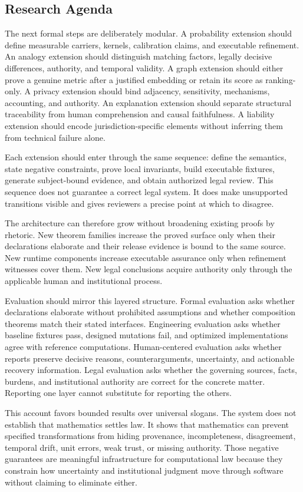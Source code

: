 \subsection*{Research Agenda}

The next formal steps are deliberately modular. A probability extension should define measurable carriers, kernels, calibration claims, and executable refinement. An analogy extension should distinguish matching factors, legally decisive differences, authority, and temporal validity. A graph extension should either prove a genuine metric after a justified embedding or retain its score as ranking-only. A privacy extension should bind adjacency, sensitivity, mechanisms, accounting, and authority. An explanation extension should separate structural traceability from human comprehension and causal faithfulness. A liability extension should encode jurisdiction-specific elements without inferring them from technical failure alone.

Each extension should enter through the same sequence: define the semantics, state negative constraints, prove local invariants, build executable fixtures, generate subject-bound evidence, and obtain authorized legal review. This sequence does not guarantee a correct legal system. It does make unsupported transitions visible and gives reviewers a precise point at which to disagree.

The architecture can therefore grow without broadening existing proofs by rhetoric. New theorem families increase the proved surface only when their declarations elaborate and their release evidence is bound to the same source. New runtime components increase executable assurance only when refinement witnesses cover them. New legal conclusions acquire authority only through the applicable human and institutional process.

Evaluation should mirror this layered structure. Formal evaluation asks whether declarations elaborate without prohibited assumptions and whether composition theorems match their stated interfaces. Engineering evaluation asks whether baseline fixtures pass, designed mutations fail, and optimized implementations agree with reference computations. Human-centered evaluation asks whether reports preserve decisive reasons, counterarguments, uncertainty, and actionable recovery information. Legal evaluation asks whether the governing sources, facts, burdens, and institutional authority are correct for the concrete matter. Reporting one layer cannot substitute for reporting the others.

This account favors bounded results over universal slogans. The system does not establish that mathematics settles law. It shows that mathematics can prevent specified transformations from hiding provenance, incompleteness, disagreement, temporal drift, unit errors, weak trust, or missing authority. Those negative guarantees are meaningful infrastructure for computational law because they constrain how uncertainty and institutional judgment move through software without claiming to eliminate either.
